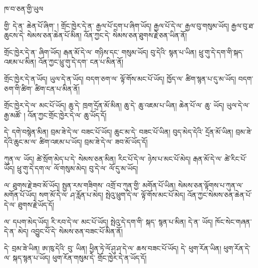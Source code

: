 \documentclass[12pt]{nextbook}
\begin{document}
\begin{readersection}{ཁ་བ་ཅན་གྱི་ཡུལ}

 གྱི་  དེ་ན་  ཆེན་པོ་ཞིག་ །
གྲོང་ཁྱེར་དེ་ན་ རྒྱལ་པོ་དྲག་པ་ཞིག་ཡོད།
རྒྱལ་པོ་དེ་ལ་ རྒྱལ་བུ་གསུམ་ཡོད།
རྒྱལ་བུ་ཐ་ཆུངས་དེ་ སེམས་ཅན་ཆེན་པོ་མིན།
འོན་ཀྱང་དེ་ སེམས་ཅན་ཐུགས་རྗེ་ཅན་ཡིན་ནོ།

གྲོང་ཁྱེར་དེ་ན་  ཞིག་ཡོད།
རྒན་མོ་དེ་ལ་  གཉིས་དང་  གསུམ་ཡོད།
བུ་དེའི་  སྙན་པ་ཡིན།
ཕྲུ་གུ་དེ་དག་གི་སྐད་ འཇམ་པ་མིན།
འོན་ཀྱང་ཕྲུ་གུ་དེ་དག་ ངན་པ་མིན་ནོ།

 གྲོང་ཁྱེར་དེ་ན་ཡོད།
 ཡུལ་དེ་ན་ཡོད།
བདག་ཅག་ལ་ ལྟོ་གོས་མང་པོ་ཡོད།
ཁྱོད་ལ་ ཚིག་སྙན་པ་དུ་མ་ཡོད།
བདག་ཅག་གི་ཚིག་ ཚིག་ངན་པ་མིན་ནོ།

གྲོང་ཁྱེར་དེ་ལ་  མང་པོ་ཡོད།
ཆུ་དེ་ ཁྲག་དྲོན་མོ་མིན།
ཆུ་དེ་ ཆུ་འཇམ་པ་ཡིན།
 ཆེན་པོ་ལ་ ཆུ་  ཡོད།
ཡུལ་དེ་ལ་ རྒྱ་མཚོ་ །
འོན་ཀྱང་གྲོང་ཁྱེར་དེ་ལ་ ཆུ་ཡོད་དོ།

 དེ་ དགེ་བསྙེན་མིན།
བྲམ་ཟེ་དེ་ལ་  བཟང་པོ་ཡོད།
ཆུང་མ་དེ་  བཟང་པོ་ཡིན།
བུད་མེད་དེའི་  དྲོན་མོ་ཡིན།
བྲམ་ཟེ་དེའི་ཆུང་མ་ལ་ ཚིག་འཇམ་པ་ཡོད།
བྲམ་ཟེ་དེ་ལ་  ཟབ་མོ་ཡོད་དོ།

 ཀུན་ལ་  ཡོད།
ཚེ་སྲོག་མེད་པ་དེ་ སེམས་ཅན་མིན།
 རིང་པོ་དེ་ལ་ ཉེས་པ་མང་པོ་མེད།
རྒན་མོ་དེ་ལ་ ཚེ་རིང་པོ་ཡོད།
ཕྲུ་གུ་དེ་དག་ལ་ ལོ་གསུམ་མེད།
བུ་དེ་ལ་ ལོ་དུ་མ་ཡོད།

 ལ་ ཐུགས་རྗེ་ཟབ་མོ་ཡོད།
སྤྱན་རས་གཟིགས་ འགྲོ་བ་ཀུན་གྱི་ མགོན་པོ་ཡིན།
སེམས་ཅན་ལྟོགས་པ་ཀུན་ལ་ མགོན་པོ་ཡོད།
སག་མོ་དེ་ལ་ ཤ་རློན་པ་མེད།
སྤེའུ་ཕྲུག་དེ་ལ་ ལྟོ་གོས་མང་པོ་མེད།
འོན་ཀྱང་སེམས་ཅན་ཆེན་པོ་དེ་ལ་ ཐུགས་རྗེ་ཡོད་དོ།

 ལ་  དཔག་མེད་ཡོད།
རི་རབ་དེ་ལ་  མང་པོ་ཡོད།
སྤེའུ་དེ་དག་གི་ སྐད་ སྙན་པ་མིན།
 དེ་ན་  ཡོད།
ཁོང་སེང་གཞན་དེ་ན་  མེད།
འབྱུང་པོ་དེ་ སེམས་ཅན་བཟང་པོ་མིན་ནོ།

 དེ་ བྲམ་ཟེ་ཡིན།
ཨ་ཁུ་དེའི་ བུ་  ཡིན།
ཕྱིན་ཏེ་ལོ་ཤུ་ཤ་དེ་ལ་ ཆས་བཟང་པོ་ཡོད།
 དེ་ ཕུག་རོན་ཡིན།
ཕུག་རོན་དེ་ལ་ སྐད་སྙན་པ་ཡོད།
ཕུག་རོན་གསུམ་དེ་ གྲོང་ཁྱེར་དེ་ན་ཡོད་དོ།

\end{readersection}
\end{document}
